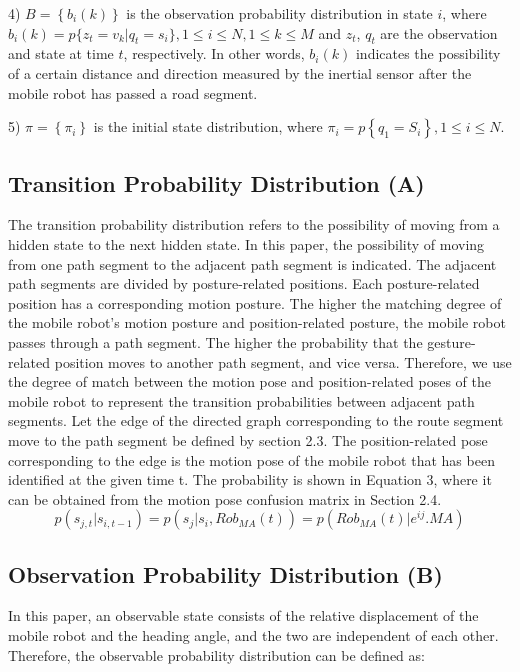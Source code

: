 \documentclass{llncs}
\begin{document}
4) $B = \left\{ {{b_i}(k)} \right\}$ is the observation probability distribution in state $i$, where ${b_i}(k) = p\{ {z_t} = {v_k}|{q_t} = {s_i}\},1 \le i \le N,1 \le k \le M$ and $z_t$, $q_t$ are the observation and state at time $t$, respectively. In other words, ${b_i}(k)$ indicates the possibility of a certain distance and direction measured by the inertial sensor after the mobile robot has passed a road segment.

5) $\pi  = \left\{ {{\pi _i}} \right\}$ is the initial state distribution, where ${\pi _i} = p\left\{ {{q_1} = {S_i}} \right\},1 \le i \le N$.

\subsection{Transition Probability Distribution (A)}

The transition probability distribution refers to the possibility of moving from a hidden state to the next hidden state. In this paper, the possibility of moving from one path segment to the adjacent path segment is indicated. The adjacent path segments are divided by posture-related positions. Each posture-related position has a corresponding motion posture. The higher the matching degree of the mobile robot's motion posture and position-related posture, the mobile robot passes through a path segment. The higher the probability that the gesture-related position moves to another path segment, and vice versa. Therefore, we use the degree of match between the motion pose and position-related poses of the mobile robot to represent the transition probabilities between adjacent path segments. Let the edge of the directed graph corresponding to the route segment move to the path segment be defined by section 2.3. The position-related pose corresponding to the edge is the motion pose of the mobile robot that has been identified at the given time t. The probability is shown in Equation 3, where it can be obtained from the motion pose confusion matrix in Section 2.4.
\begin{equation}
	p({s_{j,t}}|{s_{i,t - 1}}) = p({s_j}|{s_i},Ro{b_{MA}}(t)) = p(Ro{b_{MA}}(t)|{e^{ij}}.MA)
\end{equation}

\subsection{Observation Probability Distribution (B)}

In this paper, an observable state consists of the relative displacement of the mobile robot and the heading angle, and the two are independent of each other. Therefore, the observable probability distribution can be defined as:
\end{document}
